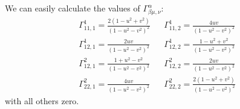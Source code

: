 \documentclass[a4paper]{article} %
\begin{document}
We can easily calculate the values of $\Gamma^{\alpha}_{\beta\mu,\nu}$:
\begin{align}
\Gamma^{1}_{11,1}=\frac{2(1-u^2+v^2)}{(1-u^2-v^2)^2}&&
\Gamma^{1}_{11,2}=\frac{4uv}{(1-u^2-v^2)^2}\\
\Gamma^{1}_{12,1}=\frac{2uv}{(1-u^2-v^2)^2}&&
\Gamma^{1}_{12,2}=\frac{1-u^2+v^2}{(1-u^2-v^2)^2}\\
\Gamma^{2}_{12,1}=\frac{1+u^2-v^2}{(1-u^2-v^2)^2}&&
\Gamma^{2}_{12,2}=\frac{2uv}{(1-u^2-v^2)^2}\\
\Gamma^{2}_{22,1}=\frac{4uv}{(1-u^2-v^2)^2}&&
\Gamma^{2}_{22,2}=\frac{2(1-u^2+v^2)}{(1-u^2-v^2)^2}
\end{align}
with all others zero.

\end{document}
